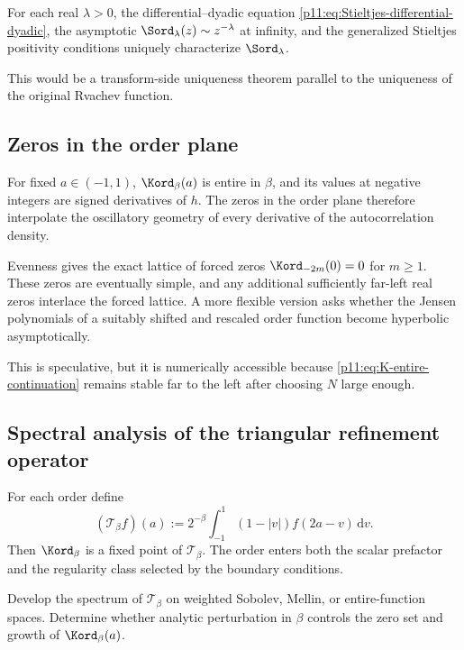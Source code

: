 \documentclass[11pt,oneside]{article}
\theoremstyle{definition}
\theoremstyle{remark}
\newcommand{\dd}{\,\mathrm d}
\newcommand{\1}{\mathbf 1}
\begin{document}
\begin{conjecture}
For each real $\lambda>0$, the differential--dyadic equation
\eqref{p11:eq:Stieltjes-differential-dyadic}, the asymptotic
$\Sord_\lambda(z)\sim z^{-\lambda}$ at infinity, and the generalized
Stieltjes positivity conditions uniquely characterize $\Sord_\lambda$.
\end{conjecture}

This would be a transform-side uniqueness theorem parallel to the uniqueness
of the original Rvachev function.

\subsection{Zeros in the order plane}

For fixed $a\in(-1,1)$, $\Kord_\beta(a)$ is entire in $\beta$, and its values
at negative integers are signed derivatives of $h$.  The zeros in the order
plane therefore interpolate the oscillatory geometry of every derivative of
the autocorrelation density.

\begin{conjecture}
Evenness gives the exact lattice of forced zeros
$\Kord_{-2m}(0)=0$ for $m\ge1$.  These zeros are eventually simple, and any
additional sufficiently far-left real zeros interlace the forced lattice.
A more flexible version asks whether the Jensen polynomials of a suitably
shifted and rescaled order function become hyperbolic asymptotically.
\end{conjecture}

This is speculative, but it is numerically accessible because
\eqref{p11:eq:K-entire-continuation} remains stable far to the left after choosing
$N$ large enough.

\subsection{Spectral analysis of the triangular refinement operator}

For each order define
\begin{equation}
 (\mathcal T_\beta f)(a)
 :=2^{-\beta}\int_{-1}^{1}(1-|v|)f(2a-v)\dd v.
\end{equation}
Then $\Kord_\beta$ is a fixed point of $\mathcal T_\beta$.  The order enters
both the scalar prefactor and the regularity class selected by the boundary
conditions.

\begin{problem}
Develop the spectrum of $\mathcal T_\beta$ on weighted Sobolev, Mellin, or
entire-function spaces.  Determine whether analytic perturbation in $\beta$
controls the zero set and growth of $\Kord_\beta(a)$.
\end{problem}
\end{document}
